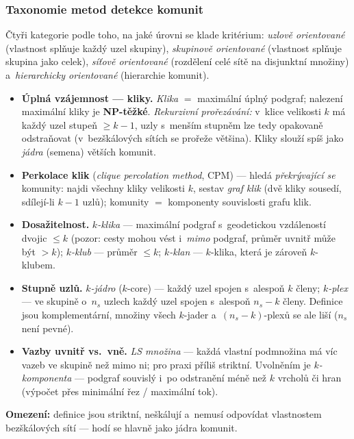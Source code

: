 \documentclass[11pt,a4paper]{article}
\theoremstyle{definition}
\begin{document}
\subsubsection{Taxonomie metod detekce komunit}

Čtyři kategorie podle toho, na jaké úrovni se klade kritérium: \emph{uzlově orientované}
(vlastnost splňuje každý uzel skupiny), \emph{skupinově orientované} (vlastnost splňuje
skupina jako celek), \emph{síťově orientované} (rozdělení celé sítě na disjunktní množiny)
a~\emph{hierarchicky orientované} (hierarchie komunit).

\begin{defbox}
\begin{itemize}
\item \textbf{Úplná vzájemnost --- kliky.} \emph{Klika} $=$ maximální úplný podgraf;
      nalezení maximální kliky je \textbf{NP-těžké}. \emph{Rekurzivní prořezávání:} v~klice
      velikosti $k$ má každý uzel stupeň $\ge k-1$, uzly s~menším stupněm lze tedy opakovaně
      odstraňovat (v~bezškálových sítích se prořeže většina). Kliky slouží spíš jako
      \emph{jádra} (semena) větších komunit.
\item \textbf{Perkolace klik} (\emph{clique percolation method}, CPM) --- hledá
      \emph{překrývající se} komunity: najdi všechny kliky velikosti $k$, sestav \emph{graf
      klik} (dvě kliky sousedí, sdílejí-li $k-1$ uzlů); komunity $=$ komponenty souvislosti
      grafu klik.
\item \textbf{Dosažitelnost.} \emph{$k$-klika} --- maximální podgraf s~geodetickou
      vzdáleností dvojic $\le k$ (pozor: cesty mohou vést i~\emph{mimo} podgraf, průměr
      uvnitř může být $>k$); \emph{$k$-klub} --- průměr $\le k$; \emph{$k$-klan} ---
      $k$-klika, která je zároveň $k$-klubem.
\item \textbf{Stupně uzlů.} \emph{$k$-jádro} ($k$-core) --- každý uzel spojen s~alespoň $k$
      členy; \emph{$k$-plex} --- ve skupině o~$n_s$ uzlech každý uzel spojen s~alespoň
      $n_s-k$ členy. Definice jsou komplementární, množiny všech $k$-jader
      a~$(n_s-k)$-plexů se ale liší ($n_s$ není pevné).
\item \textbf{Vazby uvnitř vs.\ vně.} \emph{LS množina} --- každá vlastní podmnožina má víc
      vazeb ve skupině než mimo ni; pro praxi příliš striktní. Uvolněním je
      \emph{$k$-komponenta} --- podgraf souvislý i~po odstranění méně než $k$ vrcholů či
      hran (výpočet přes minimální řez / maximální tok).
\end{itemize}
\textbf{Omezení:} definice jsou striktní, neškálují a~nemusí odpovídat vlastnostem
bezškálových sítí --- hodí se hlavně jako jádra komunit.
\end{defbox}
\end{document}
